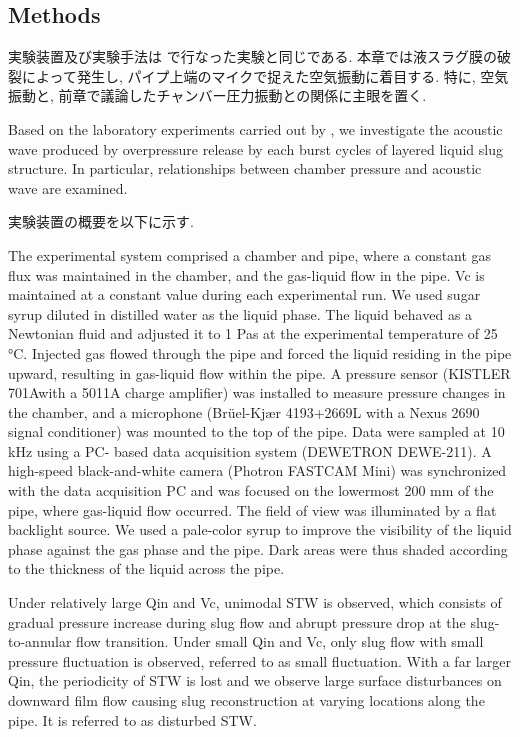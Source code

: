 \documentclass[12pt]{article}
\begin{document}
\clearpage \newpage
\subsection{Methods}\label{ACOresult}
実験装置及び実験手法は \cite{kanno2018} で行なった実験と同じである. 
本章では液スラグ膜の破裂によって発生し, パイプ上端のマイクで捉えた空気振動に着目する. 
特に, 空気振動と, 前章で議論したチャンバー圧力振動との関係に主眼を置く.  

Based on the laboratory experiments carried out by \cite{kanno2018}, we investigate the acoustic wave produced by overpressure release by each burst cycles of layered liquid slug structure. 
In particular, relationships between chamber pressure and acoustic wave are examined.

実験装置の概要を以下に示す. 

The experimental system comprised a chamber and pipe, where a constant gas flux was maintained in the chamber, and the gas-liquid flow in the pipe.
Vc is maintained at a constant value during each experimental run. 
We used sugar syrup diluted in distilled water as the liquid phase. 
The liquid behaved as a Newtonian fluid and adjusted it to 1 Pas at the experimental temperature of 25 °C. 
Injected gas flowed through the pipe and forced the liquid residing in the pipe upward, resulting in gas-liquid flow within the pipe.
A pressure sensor (KISTLER 701Awith a 5011A charge amplifier) was installed to measure pressure changes in the chamber, and a microphone (Br\"uel-Kj\ae r 4193+2669L with a Nexus 2690 signal conditioner) was mounted to the top of the pipe. Data were sampled at 10 kHz using a PC- based data acquisition system (DEWETRON DEWE-211). A high-speed black-and-white camera (Photron FASTCAM Mini) was synchronized with the data acquisition PC and was focused on the lowermost 200 mm of the pipe, where gas-liquid flow occurred. The field of view was illuminated by a flat backlight source. We used a pale-color syrup to improve the visibility of the liquid phase against the gas phase and the pipe. Dark areas were thus shaded according to the thickness of the liquid across the pipe.

Under relatively large Qin and Vc, unimodal STW is observed, which consists of gradual pressure increase during slug flow and abrupt pressure drop at the slug-to-annular flow transition. Under small Qin and Vc, only slug flow with small pressure fluctuation is observed, referred to as small fluctuation. With a far larger Qin, the periodicity of STW is lost and we observe large surface disturbances on downward film flow causing slug reconstruction at varying locations along the pipe. It is referred to as disturbed STW.
\end{document}
